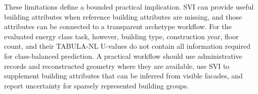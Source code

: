 These limitations define a bounded practical implication. \Ac{SVI} can provide useful building attributes when reference building attributes are missing, and those attributes can be connected to a transparent archetype workflow. For the evaluated energy class task, however, building type, construction year, floor count, and their TABULA-NL U-values do not contain all information required for class-balanced prediction. A practical workflow should use administrative records and reconstructed geometry where they are available, use \ac{SVI} to supplement building attributes that can be inferred from visible facades, and report uncertainty for sparsely represented building groups.
